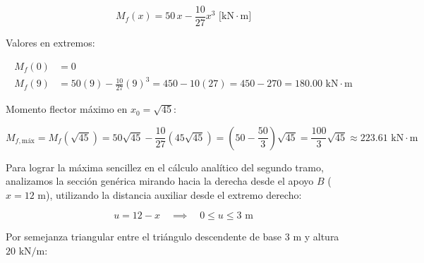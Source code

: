 \begin{itemize}
\begin{equation}
          \end{equation}

          \begin{equation}

              \boxed{M_f(x) = 50\,x - \frac{10}{27}x^3\text{ [kN}\cdot\text{m]}}

          \end{equation}

          Valores en extremos:

          \begin{align*}

              M_f(0) & = 0                                                                                     \\

              M_f(9) & = 50(9) - \frac{10}{27}(9)^3 = 450 - 10(27) = 450 - 270 = 180.00\text{ kN}\cdot\text{m}

          \end{align*}

          Momento flector máximo en $x_0 = \sqrt{45}$:

          \begin{equation}

              M_{f,\text{máx}} = M_f(\sqrt{45}) = 50\sqrt{45} - \frac{10}{27}(45\sqrt{45}) = \left(50 - \frac{50}{3}\right)\sqrt{45} = \frac{100}{3}\sqrt{45} \approx \boxed{223.61\text{ kN}\cdot\text{m}}

          \end{equation}

\end{itemize}






Para lograr la máxima sencillez en el cálculo analítico del segundo tramo, analizamos la sección genérica mirando hacia la derecha desde el apoyo $B$ ($x = 12\text{ m}$), utilizando la distancia auxiliar desde el extremo derecho:

\begin{equation}

    u = 12 - x \quad \implies \quad 0 \le u \le 3\text{ m}

\end{equation}

Por semejanza triangular entre el triángulo descendente de base $3\text{ m}$ y altura $20\text{ kN/m}$:


